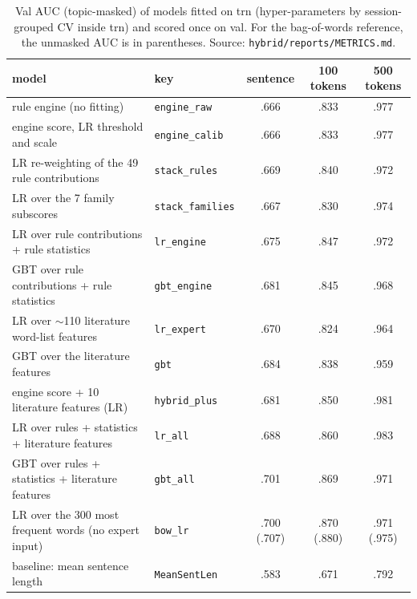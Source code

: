 \begin{table}[tbp]
\centering\footnotesize
\caption{Val AUC (topic-masked) of models fitted on trn (hyper-parameters by session-grouped CV
inside trn) and scored once on val. For the bag-of-words reference, the unmasked AUC is in
parentheses. Source: \texttt{hybrid/reports/METRICS.md}.}
\label{tab-hybrid}
\begin{tabular}{@{}l l c c c@{}}
\toprule
model & key & sentence & 100 tokens & 500 tokens \\
\midrule
rule engine (no fitting) & \texttt{engine\_raw} & .666 & .833 & .977 \\
engine score, LR threshold and scale & \texttt{engine\_calib} & .666 & .833 & .977 \\
LR re-weighting of the 49 rule contributions & \texttt{stack\_rules} & .669 & .840 & .972 \\
LR over the 7 family subscores & \texttt{stack\_families} & .667 & .830 & .974 \\
LR over rule contributions + rule statistics & \texttt{lr\_engine} & .675 & .847 & .972 \\
GBT over rule contributions + rule statistics & \texttt{gbt\_engine} & .681 & .845 & .968 \\
LR over $\sim$110 literature word-list features & \texttt{lr\_expert} & .670 & .824 & .964 \\
GBT over the literature features & \texttt{gbt} & .684 & .838 & .959 \\
engine score + 10 literature features (LR) & \texttt{hybrid\_plus} & .681 & .850 & .981 \\
LR over rules + statistics + literature features & \texttt{lr\_all} & .688 & .860 & .983 \\
GBT over rules + statistics + literature features & \texttt{gbt\_all} & .701 & .869 & .971 \\
\midrule
LR over the 300 most frequent words (no expert input) & \texttt{bow\_lr} & .700 (.707) & .870 (.880) & .971 (.975) \\
baseline: mean sentence length & \texttt{MeanSentLen} & .583 & .671 & .792 \\
\bottomrule
\end{tabular}
\end{table}
